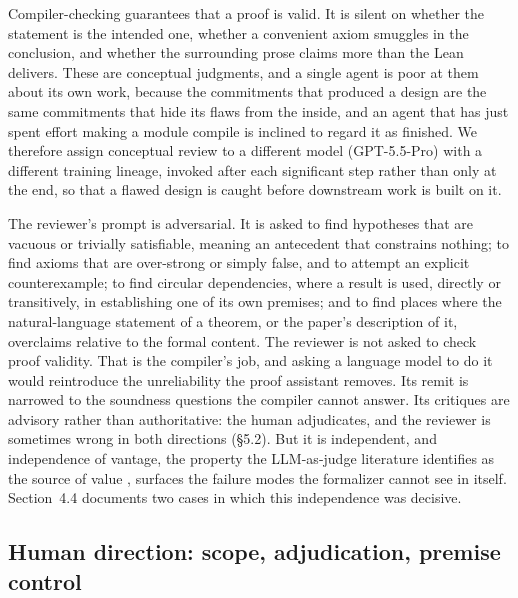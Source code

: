 \documentclass[11pt]{article}
\begin{document}
Compiler-checking guarantees that a proof is valid. It is silent on whether the statement is the
intended one, whether a convenient axiom smuggles in the conclusion, and whether the surrounding
prose claims more than the Lean delivers. These are conceptual judgments, and a single agent is poor
at them about its own work, because the commitments that produced a design are the same commitments
that hide its flaws from the inside, and an agent that has just spent effort making a module compile
is inclined to regard it as finished. We therefore assign conceptual review to a different model
(GPT-5.5-Pro) with a different training lineage, invoked after each significant step rather than only
at the end, so that a flawed design is caught before downstream work is built on it.

The reviewer's prompt is adversarial. It is asked to find hypotheses that are vacuous or trivially
satisfiable, meaning an antecedent that constrains nothing; to find axioms that are over-strong or
simply false, and to attempt an explicit counterexample; to find circular dependencies, where a
result is used, directly or transitively, in establishing one of its own premises; and to find
places where the natural-language statement of a theorem, or the paper's description of it,
overclaims relative to the formal content. The reviewer is not asked to check proof validity. That
is the compiler's job, and asking a language model to do it would reintroduce the unreliability the
proof assistant removes. Its remit is narrowed to the soundness questions the compiler cannot
answer. Its critiques are advisory rather than authoritative: the human adjudicates, and the reviewer
is sometimes wrong in both directions (\S5.2). But it is independent, and independence of vantage,
the property the LLM-as-judge literature identifies as the source of value \cite{r19,r22}, surfaces
the failure modes the formalizer cannot see in itself. Section~4.4 documents two cases in which this
independence was decisive.

\subsection{Human direction: scope, adjudication, premise control}
\end{document}
